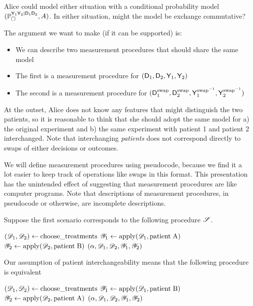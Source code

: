 Alice could model either situation with a conditional probability model $(\mathbb{P}_\square^{\mathsf{Y}_1\mathsf{Y}_2|\mathsf{D}_1\mathsf{D}_2},A)$. In either situation, might the model be exchange commutative?

The argument we want to make (if it can be supported) is:
\begin{itemize}
    \item We can describe two measurement procedures that should share the same model
    \item The first is a measurement procedure for $(\mathsf{D}_1,\mathsf{D}_2,\mathsf{Y}_1,\mathsf{Y}_2)$
    \item The second is a measurement procedure for $(\mathsf{D}^{\text{swap}}_1,\mathsf{D}^{\text{swap}}_2,\mathsf{Y}^{\text{swap}^{-1}}_1,\mathsf{Y}^{\text{swap}^{-1}}_2)$
\end{itemize}

At the outset, Alice does not know any features that might distinguish the two patients, so it is reasonable to think that she should adopt the same model for a) the original experiment and b) the same experiment with patient 1 and patient 2 interchanged. Note that interchanging \emph{patients} does not correspond directly to swaps of either decisions or outcomes.

We will define measurement procedures using pseudocode, because we find it a lot easier to keep track of operations like swaps in this format. This presentation has the unintended effect of suggesting that measurement procedures are like computer programs. Note that descriptions of measurement procedures, in pseudocode or otherwise, are incomplete descriptions.

Suppose the first scenario corresponds to the following procedure $\mathscr{S}$.
\begin{algorithmic}
    \State $(\mathscr{D}_1,\mathscr{D}_2) \gets \mathrm{choose\_treatments}$
    \State $\mathscr{Y}_1\gets \mathrm{apply}(\mathscr{D}_1,\mathrm{patient\;A})$
    \State $\mathscr{Y}_2\gets \mathrm{apply}(\mathscr{D}_2,\mathrm{patient\;B})$
    \State \Return $(\alpha,\mathscr{D}_1,\mathscr{D}_2,\mathscr{Y}_1,\mathscr{Y}_2)$
    \EndProcedure
\end{algorithmic}

Our assumption of patient interchangeability means that the following procedure is equivalent

\begin{algorithmic}
    \State $(\mathscr{D}_1,\mathscr{D}_2) \gets \mathrm{choose\_treatments}$
    \State $\mathscr{Y}_1\gets \mathrm{apply}(\mathscr{D}_1,\mathrm{patient\;B})$
    \State $\mathscr{Y}_2\gets \mathrm{apply}(\mathscr{D}_2,\mathrm{patient\;A})$
    \State \Return $(\alpha,\mathscr{D}_1,\mathscr{D}_2,\mathscr{Y}_1,\mathscr{Y}_2)$
    \EndProcedure
\end{algorithmic}

